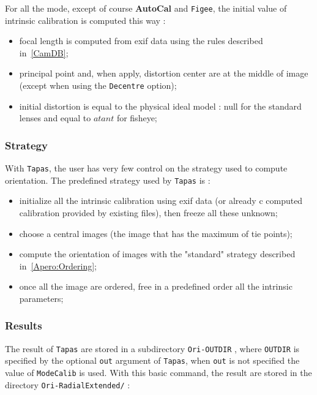 For all the mode, except of course {\bf AutoCal} and {\tt Figee},  the initial
value of intrinsic calibration is computed this way :

\begin{itemize}
   \item focal length is computed from exif data using the rules described in~\ref{CamDB};

   \item principal point and, when apply, distortion center are  at the middle
	 of image (except when using the {\tt Decentre} option);

   \item initial distortion is equal to the physical ideal model :   null for the
	 standard lenses and equal to $atant$ for  fisheye;

\end{itemize}

\subsubsection{Strategy}

With {\tt Tapas}, the user has very few control on the  strategy used to compute
orientation.  The predefined strategy used by {\tt Tapas} is :

\begin{itemize}
   \item initialize all the intrinsic calibration using exif data (or already c
	 computed calibration provided by existing files), then freeze all these unknown;

   \item choose a central images (the image that has the maximum of tie points);

   \item compute the orientation of images with the "standard" strategy described
	  in~\ref{Apero:Ordering};


   \item once all the image are ordered, free in a predefined order all the intrinsic
	 parameters;

\end{itemize}

\subsubsection{Results}

The result of {\tt Tapas} are stored in a subdirectory {\tt Ori-OUTDIR} ,
where {\tt OUTDIR} is specified by the optional {\tt out} argument of {\tt Tapas},
when {\tt out} is not specified the value of {\tt ModeCalib} is used.
With this basic command, the result are stored in the directory {\tt Ori-RadialExtended/} :



